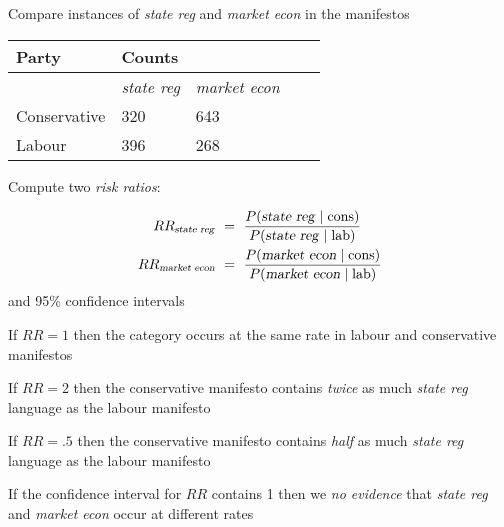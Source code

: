 \documentclass{mediumfoils}
\begin{document}
Compare instances of \textsl{state reg} and \textsl{market econ} in the manifestos\\
\begin{center}
\begin{tabular}{lllll}\toprule
Party & \multicolumn{2}{l}{Counts}  \\ \midrule 
      & \textsl{state reg}    &    \textsl{market econ}  \\ 
Conservative  & 320   & 643 \\ 
Labour   & 396   & 268      \\ \bottomrule
\end{tabular}
\end{center}


Compute two \textsl{risk ratios}:

\begin{align*}
RR_{\text{\textsl{state reg}}} & ~=~ \frac{P(\text{\textsl{state reg}} \mid \text{cons})}
{P(\text{\textsl{state reg}} \mid \text{lab})}\\
RR_{\text{\textsl{market econ}}} & ~=~ \frac{P(\text{\textsl{market econ}} \mid \text{cons})}
{P(\text{\textsl{market econ}} \mid \text{lab})}
\end{align*}
and 95\% confidence intervals

%
%
%

If $RR=1$ then the category occurs at the same rate in labour and conservative manifestos

If $RR=2$ then the conservative manifesto contains \textsl{twice} as much \textsl{state reg} language as the labour manifesto

If $RR=.5$ then the conservative manifesto contains \textsl{half} as much \textsl{state reg} language as the labour manifesto

If the confidence interval for $RR$ contains 1 then we \textsl{no evidence} that \textsl{state reg} and \textsl{market econ} occur at different rates
\end{document}

